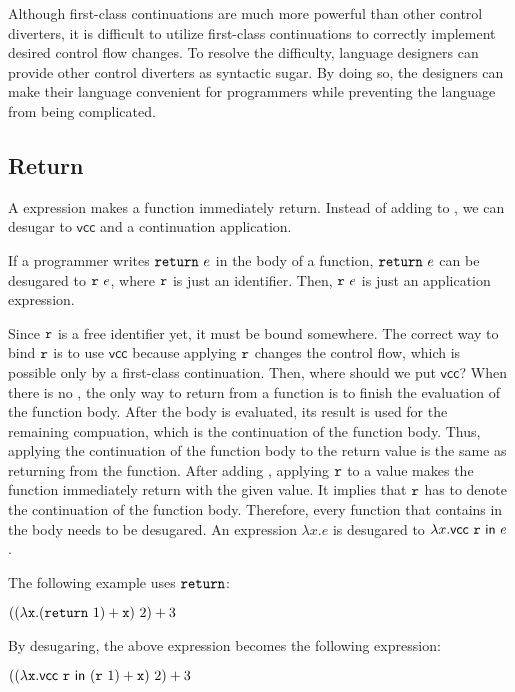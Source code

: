 Although first-class continuations are much more powerful than other control
diverters, it is difficult to utilize first-class continuations to correctly
implement desired control flow changes. To resolve the difficulty, language
designers can provide other control diverters as syntactic sugar. By doing so,
the designers can make their language convenient for programmers while
preventing the language from being complicated.

\subsection{Return}

A  expression makes a function immediately return.
Instead of adding  to \lang, we can desugar  to
$\textsf{vcc}$ and a continuation application.

If a programmer writes
$\code{return}\ e$ in the body of a function, $\code{return}\ e$
can be desugared to $\texttt{r}\ e$, where $\texttt{r}$ is just an identifier.
Then, $\texttt{r}\ e$ is just an application expression.

Since $\texttt{r}$ is a free
identifier yet, it must be bound somewhere. The correct way to bind $\texttt{r}$
is to use $\textsf{vcc}$ because applying $\texttt{r}$ changes the control flow,
which is possible only by a first-class continuation. Then, where should we put
$\textsf{vcc}$? When there is no
, the only way to return from a function is to finish the
evaluation of the function body. After the body is evaluated, its result is used
for the remaining compuation, which is the continuation of the function body.
Thus, applying the continuation of the function body to the return value is the same as
returning from the function. After adding , applying $\texttt{r}$
to a value makes the function immediately return with the given value.
It implies that $\texttt{r}$ has to denote the continuation of the function body.
Therefore, every function that contains  in the body needs to be
desugared. An expression $\lambda x.e$ is desugared to
$\lambda x.\textsf{vcc}\ \texttt{r}\ \textsf{in}\ e$.

The following example uses $\texttt{return}$:

$((\lambda \cx.(\code{return}\ 1)+\cx)\ 2)+3$

By desugaring, the above expression becomes the following expression:

$((\lambda \cx.\evcc{\code{r}}{(\code{r}\ 1)+\cx})\ 2)+3$

